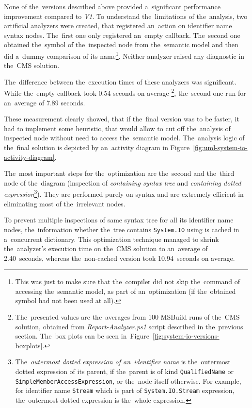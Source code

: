 \documentclass[
  digital, %
  table,   %
  lof,     %
  lot,     %
  oneside,
]{fithesis3}
\begin{document}
None of the~versions described above provided a~significant performance improvement compared to \textit{V1}. To understand the~limitations of the~analysis, two artificial analyzers were created, that registered an~action on identifier name syntax nodes. The~first one only registered an~empty callback. The~second one obtained the~symbol of the~inspected node from the~semantic model and then did a~dummy comparison of its name\footnote{This was just to make sure that the~compiler did not skip the~command of accessing the~semantic model, as part of an~optimization (if the~obtained symbol had not been used at all).}. Neither analyzer raised any diagnostic in the~CMS solution. 

The~difference between the~execution times of these analyzers was significant. While the~empty callback took 0.54 seconds on average \footnote{The~presented values are the~averages from 100 MSBuild runs of the~CMS solution, obtained from \textit{Report-Analyzer.ps1} script described in the~previous section. The~box plots can be seen in~Figure~\ref{fig:system-io-versions-boxplots}.}, the~second one run for an~average of 7.89 seconds. 

These measurement clearly showed, that if the~final version was to be faster, it had to implement some heuristic, that would allow to cut off the~analysis of inspected node without need to access the~semantic model. The~analysis logic of the~final solution is depicted by an~activity diagram in Figure~\ref{fig:uml-system-io-activity-diagram}. 

The~most important steps for the~optimization are the~second and the~third node of the~diagram (inspection of \textit{containing syntax tree} and \textit{containing dotted expression}\footnote{The~\textit{outermost dotted expression of an~identifier name} is the~outermost dotted expression of its parent, if the~parent is of kind \texttt{QualifiedName} or \texttt{SimpleMemberAccessExpression}, or the~node itself otherwise. For example, for identifier name \texttt{Stream} which is part of \texttt{System.IO.Stream} expression, the~outermost dotted expression is the~whole expression.}). They are performed purely on syntax and are extremely efficient in eliminating most of the~irrelevant nodes. 

To prevent multiple inspections of same syntax tree for all its identifier name nodes, the~information whether the~tree contains \texttt{System.IO} using is cached in a~concurrent dictionary. This optimization technique managed to shrink the~analyzer's execution time on the~CMS solution to an~average of 2.40~seconds, whereas the~non-cached version took 10.94~seconds on average. 
\end{document}
